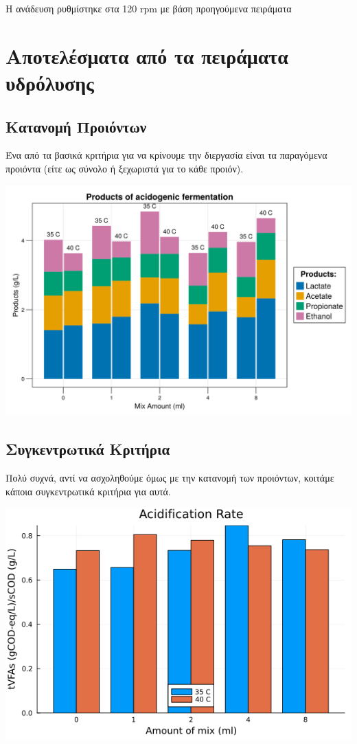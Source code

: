 \documentclass[11pt]{article}
\begin{document}
Η ανάδευση ρυθμίστηκε στα 120 rpm με βάση προηγούμενα πειράματα

\section{Αποτελέσματα από τα πειράματα υδρόλυσης}
\label{sec:org4df776a}
\subsection{Κατανομή Προιόντων}
\label{sec:org32396b0}
Ένα από τα βασικά κριτήρια για να κρίνουμε την διεργασία είναι τα παραγόμενα προιόντα (είτε ως σύνολο ή ξεχωριστά για το κάθε προιόν).

\begin{center}
\includegraphics[width=.9\linewidth]{../plots/35_40_comp/final_products.png}
\end{center}

\subsection{Συγκεντρωτικά Κριτήρια}
\label{sec:org8646fa4}
Πολύ συχνά, αντί να ασχοληθούμε όμως με την κατανομή των προιόντων, κοιτάμε κάποια συγκεντρωτικά κριτήρια για αυτά.

\begin{center}
\includegraphics[width=.9\linewidth]{../plots/35_40_comp/acidification_comp.png}
\end{center}
\end{document}
